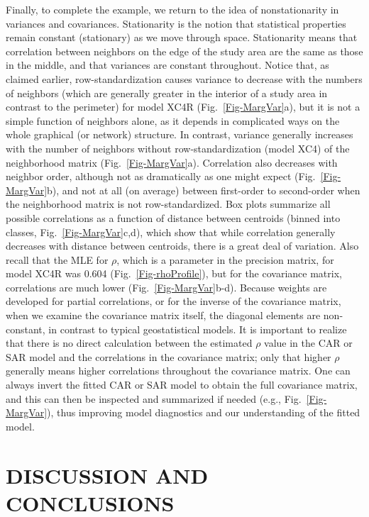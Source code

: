 \documentclass[11pt, titlepage]{article}\usepackage[]{graphicx}\usepackage[]{color}
\begin{document}
\begin{spacing}{1.9}
\begin{flushleft}
Finally, to complete the example, we return to the idea of nonstationarity in variances and covariances.  Stationarity is the notion that statistical properties remain constant (stationary) as we move through space.  Stationarity means that correlation between neighbors on the edge of the study area are the same as those in the middle, and that variances are constant throughout. Notice that, as claimed earlier, row-standardization causes variance to decrease with the numbers of neighbors (which are generally greater in the interior of a study area in contrast to the perimeter) for model XC4R (Fig.~\ref{Fig-MargVar}a), but it is not a simple function of neighbors alone, as it depends in complicated ways on the whole graphical (or network) structure.  In contrast, variance generally increases with the number of neighbors without row-standardization (model XC4) of the neighborhood matrix (Fig.~\ref{Fig-MargVar}a). Correlation also decreases with neighbor order, although not as dramatically as one might expect (Fig.~\ref{Fig-MargVar}b), and not at all (on average) between first-order to second-order when the neighborhood matrix is not row-standardized. Box plots summarize all possible correlations as a function of distance between centroids (binned into classes, Fig.~\ref{Fig-MargVar}c,d), which show that while correlation generally decreases with distance between centroids, there is a great deal of variation. Also recall that the MLE for $\rho$, which is a parameter in the precision matrix, for model XC4R was 0.604 (Fig.~\ref{Fig-rhoProfile}), but for the covariance matrix, correlations are much lower (Fig.~\ref{Fig-MargVar}b-d). Because weights are developed for partial correlations, or for the inverse of the covariance matrix, when we examine the covariance matrix itself, the diagonal elements are non-constant, in contrast to typical geostatistical models. It is important to realize that there is no direct calculation between the estimated $\rho$ value in the CAR or SAR model and the correlations in the covariance matrix; only that higher $\rho$ generally means higher correlations throughout the covariance matrix. One can always invert the fitted CAR or SAR model to obtain the full covariance matrix, and this can then be inspected and summarized if needed (e.g., Fig.~\ref{Fig-MargVar}), thus improving model diagnostics and our understanding of the fitted model.

\section*{DISCUSSION AND CONCLUSIONS}


\end{flushleft}
\end{spacing}
\end{document}
